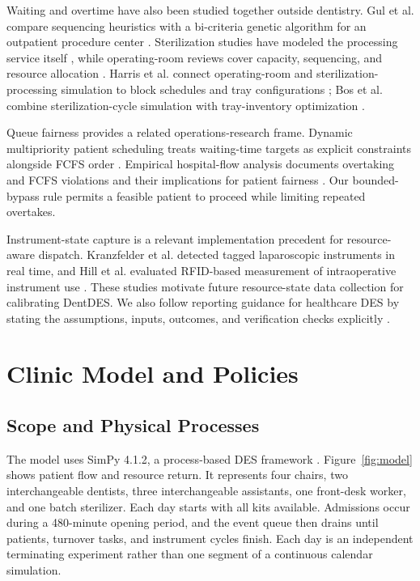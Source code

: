 \documentclass[conference]{IEEEtran}
\begin{document}
Waiting and overtime have also been studied together outside dentistry. Gul et al. compare sequencing heuristics with a bi-criteria genetic algorithm for an outpatient procedure center \cite{gul2011}. Sterilization studies have modeled the processing service itself \cite{dimascolo2013}, while operating-room reviews cover capacity, sequencing, and resource allocation \cite{cardoen2010,guerriero2011}. Harris et al. connect operating-room and sterilization-processing simulation to block schedules and tray configurations \cite{harris2024}; Bos et al. combine sterilization-cycle simulation with tray-inventory optimization \cite{bos2026}.

Queue fairness provides a related operations-research frame. Dynamic multipriority patient scheduling treats waiting-time targets as explicit constraints alongside FCFS order \cite{patrick2008}. Empirical hospital-flow analysis documents overtaking and FCFS violations and their implications for patient fairness \cite{armony2015}. Our bounded-bypass rule permits a feasible patient to proceed while limiting repeated overtakes.

Instrument-state capture is a relevant implementation precedent for resource-aware dispatch. Kranzfelder et al. detected tagged laparoscopic instruments in real time, and Hill et al. evaluated RFID-based measurement of intraoperative instrument use \cite{kranzfelder2013,hill2022}. These studies motivate future resource-state data collection for calibrating DentDES. We also follow reporting guidance for healthcare DES by stating the assumptions, inputs, outcomes, and verification checks explicitly \cite{zhang2020}.

\section{Clinic Model and Policies}
\subsection{Scope and Physical Processes}\label{subsec:scope}
The model uses SimPy 4.1.2, a process-based DES framework \cite{simpy}. Figure~\ref{fig:model} shows patient flow and resource return. It represents four chairs, two interchangeable dentists, three interchangeable assistants, one front-desk worker, and one batch sterilizer. Each day starts with all kits available. Admissions occur during a 480-minute opening period, and the event queue then drains until patients, turnover tasks, and instrument cycles finish. Each day is an independent terminating experiment rather than one segment of a continuous calendar simulation.
\end{document}
